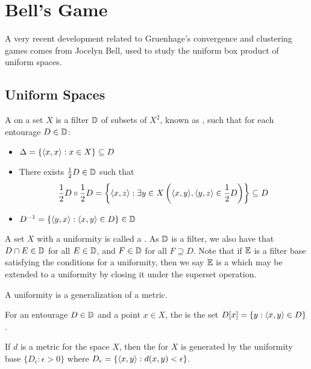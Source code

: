 
\chapter{Bell's Game}

A very recent development related to Gruenhage's convergence and
clustering games comes from
Jocelyn Bell, used to study the uniform box product of uniform spaces.

\section{Uniform Spaces}

\begin{defn}
  A  on a set $X$ is a filter $\mathbb{D}$ of subsets of $X^2$,
  known as , such that for each entourage $D\in\mathbb{D}$:
  \begin{itemize}
    \item $\Delta=\{\langle x,x\rangle:x\in X\}\subseteq D$
    \item There exists $\frac{1}{2}D\in\mathbb{D}$ such that
      \[
        \frac{1}{2}D\circ\frac{1}{2}D
          =
        \left\{\langle x,z\rangle:\exists y\in X\left(\langle x,y\rangle,\langle y,z\rangle\in\frac{1}{2}D\right)\right\}
          \subseteq
        D
      \]
    \item $D^{-1}=\{\langle y,x\rangle:\langle x,y\rangle\in D\}\in \mathbb{D}$
  \end{itemize}
\end{defn}

A set $X$ with a uniformity is called a .
As $\mathbb{D}$ is a filter, we also have that $D\cap E\in \mathbb{D}$ for all
$E\in\mathbb{D}$, and $F\in \mathbb{D}$ for all $F\supseteq D$. Note that if $\mathbb{E}$ is
a filter base satisfying the conditions for a uniformity, then we say
$\mathbb{E}$ is a  which may be extended to a uniformity by
closing it under the superset operation.

A uniformity is a generalization of a metric.

\begin{defn}
  For an entourage $D\in\mathbb{D}$ and a point $x\in X$, the
   is the set $D[x]=\{y:\langle x,y\rangle\in D\}$.
\end{defn}

\begin{defn}
  If $d$ is a metric for the space $X$, then the  for
  $X$ is generated by the uniformity base $\{D_\epsilon:\epsilon>0\}$
  where $D_\epsilon = \{\langle x,y\rangle:d(x,y)<\epsilon\}$.
\end{defn}

